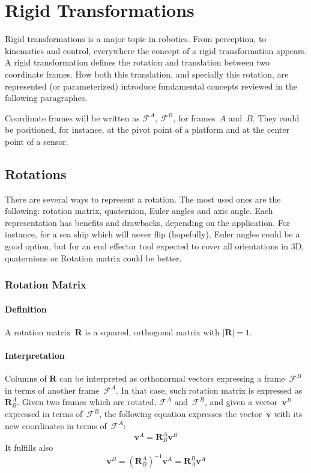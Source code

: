 
\section{Rigid Transformations}

Rigid transformations is a major topic in robotics. From perception, to kinematics and control, everywhere the concept of a rigid transformation appears. A rigid transformation defines the rotation and translation between two coordinate frames. How  both this translation, and specially this rotation, are represented (or parameterized) introduce fundamental concepts reviewed in the following paragraphes. 

Coordinate frames will be written as $\mathcal{F}^A,\ \mathcal{F}^B$, for frames~$A$ and~$B$. They could be positioned, for instance, at the pivot point of a platform and at the center point of a sensor.  

\subsection{Rotations}
There are several ways to represent a rotation. The most used ones are the following: rotation matrix, quaternion, Euler angles and axis angle. Each representation has benefits and drawbacks, depending on the application. For instance, for a sea ship which will never flip (hopefully), Euler angles could be a good option, but for an end effector tool expected to cover all orientations in 3D, quaternions or Rotation matrix could be better. 

\subsubsection{Rotation Matrix}
\paragraph{Definition} A rotation matrix~$\mathbf{R}$ is a squared, orthogonal matrix with $|\mathbf{R}|=1$. 

\paragraph{Interpretation} Columns of $\mathbf{R}$ can be interpreted as orthonormal vectors expressing a frame~$\mathcal{F}^B$ in terms of another frame~$\mathcal{F}^A$. In that case, such rotation matrix is expressed as~$\mathbf{R}^A_B$. Given two frames which are rotated, $\mathcal{F}^A$ and~$\mathcal{F}^B$, and given a vector~$\mathbf{v}^B$ expressed in terms of~$\mathcal{F}^B$, the following equation expresses the vector~$\mathbf{v}$ with its new coordinates in terms of~$\mathcal{F}^A$:
\begin{equation}
 \mathbf{v}^A = \mathbf{R}^A_B \mathbf{v}^B
\end{equation}
It fulfills also 
\begin{equation}
 \mathbf{v}^B = (\mathbf{R}^A_B)^{-1} \mathbf{v}^A = \mathbf{R}^B_A \mathbf{v}^A
\end{equation}

